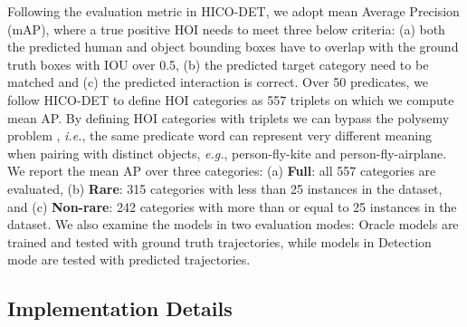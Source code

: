 \documentclass[sigconf]{acmart}
\begin{document}
Following the evaluation metric in HICO-DET, we adopt mean Average Precision (mAP), where a true positive HOI needs to meet three below criteria: (a) both the predicted human and object bounding boxes have to overlap with the ground truth boxes with IOU over 0.5, (b) the predicted target category need to be matched and (c) the predicted interaction is correct. 
Over 50 predicates, we follow HICO-DET to define HOI categories as 557 triplets on which we compute mean AP.
By defining HOI categories with triplets we can bypass the polysemy problem \cite{zhong2020polysemy}, \emph{i.e.}, the same predicate word can represent very different meaning when pairing with distinct objects, \emph{e.g.}, {\selectfont person-fly-kite} and {\selectfont person-fly-airplane}.
We report the mean AP over three categories: (a) \textbf{Full}: all 557 categories are evaluated, (b) \textbf{Rare}: 315 categories with less than 25 instances in the dataset, and (c) \textbf{Non-rare}: 242 categories with more than or equal to 25 instances in the dataset.
We also examine the models in two evaluation modes: {\selectfont Oracle} models are trained and tested with ground truth trajectories, while models in {\selectfont Detection} mode are tested with predicted trajectories.

\subsection{Implementation Details}
\label{subsec:implementation}
\end{document}

